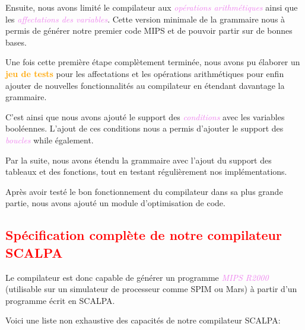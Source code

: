 \documentclass[a4paper]{article}
\let\oldtextbf\textbf
\renewcommand{\textbf}[1]{\textcolor{orange}{\oldtextbf{#1}}}
\let\oldtextit\textit
\renewcommand{\textit}[1]{\textcolor{violet}{\oldtextit{#1}}}
\newcommand{\csection}[1]{\textcolor{red}{\section{#1}}}
\begin{document}
Ensuite, nous avons limité le compilateur aux \textit{opérations arithmétiques} ainsi que les \textit{affectations des variables}. Cette version minimale de la grammaire nous à permis de générer notre premier code MIPS et de pouvoir partir sur de bonnes bases.

Une fois cette première étape complètement terminée, nous avons pu élaborer un \textbf{jeu de tests} pour les affectations et les opérations arithmétiques pour enfin ajouter de nouvelles fonctionnalités au compilateur en étendant davantage la grammaire.

C'est ainsi que nous avons ajouté le support des \textit{conditions} avec les variables booléennes. L'ajout de ces conditions nous a permis d'ajouter le support des \textit{boucles} while également.

Par la suite, nous avons étendu la grammaire avec l'ajout du support des tableaux et des fonctions, tout en testant régulièrement nos implémentations.

Après avoir testé le bon fonctionnement du compilateur dans sa plus grande partie, nous avons ajouté un module d'optimisation de code.

\clearpage

\csection{Spécification complète de notre compilateur SCALPA}

Le compilateur est donc capable de générer un programme \textit{MIPS R2000} (utilisable sur un simulateur de processeur comme SPIM ou Mars) à partir d'un programme écrit en SCALPA.

Voici une liste non exhaustive des capacités de notre compilateur SCALPA:
\end{document}

